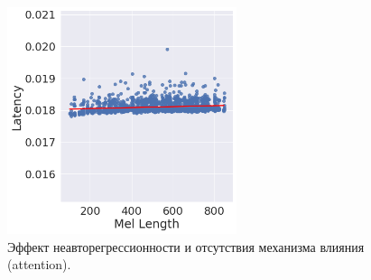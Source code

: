 \begin{frame}
\begin{table}[!ht]
\centering
{}
\caption{TalkNet inference latency for mel-spectrogram generation (without vocoder). The latency was measured with batch size $1$ using a V100 GPU and averaged over 2048 samples from LJSpeech. Latency and Real-Time-Factor (RTF) with $95\%$ confidence interval.}
\end{table}
\end{frame}

\begin{frame}
\begin{figure}[H]
\centering
\includegraphics[width=0.6\textwidth]{images/len-lat.png}
\caption{Эффект неавторегрессионности и отсутствия механизма влияния (attention).}
\end{figure}
\end{frame}

